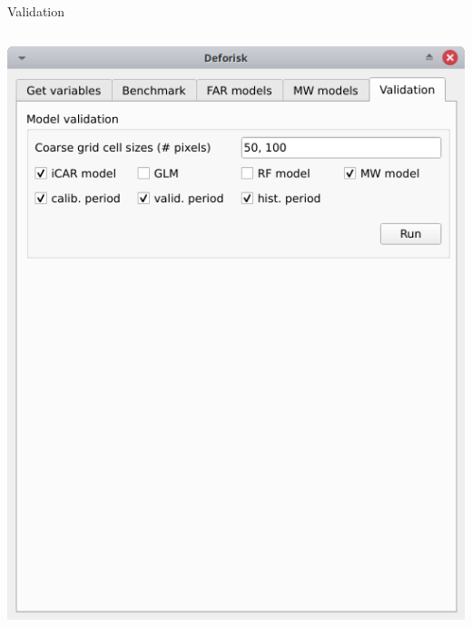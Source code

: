 \documentclass[10pt,table,dvipsnames,compress]{beamer}
\begin{document}
\begin{frame}[label={sec:org2b0ec9c}]{Validation}
\begin{columns}
\begin{column}{0.5\columnwidth}
\begin{center}
\includegraphics[width=\textwidth]{figs/plugin_api/interface_validation.png}
\end{center}
\end{column}
\end{columns}
\end{frame}
\end{document}
